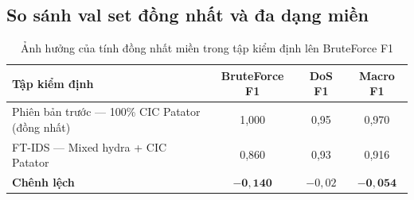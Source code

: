 \documentclass[../DoAn.tex]{subfiles}
\begin{document}
\subsection{So sánh val set đồng nhất và đa dạng miền}

\begin{table}[H]
    \centering
    \caption{Ảnh hưởng của tính đồng nhất miền trong tập kiểm định lên BruteForce F1}
    \label{tab:res-valset}
    \begin{tabular}{lccc}
        \hline
        \textbf{Tập kiểm định} & \textbf{BruteForce F1} & \textbf{DoS F1} & \textbf{Macro F1} \\
        \hline
        Phiên bản trước --- 100\% CIC Patator (đồng nhất) & 1,000 & 0,95 & 0,970 \\
        FT-IDS --- Mixed hydra + CIC Patator    & 0,860 & 0,93 & 0,916 \\
        \textbf{Chênh lệch}                   & $\mathbf{-0{,}140}$ & $-0{,}02$ & $\mathbf{-0{,}054}$ \\
        \hline
    \end{tabular}
\end{table}
\end{document}
